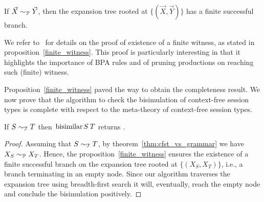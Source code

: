 \begin{proposition} 
\label{finite_witness}
	If $\vec X \sim_\mathcal P \vec Y$, then the expansion tree rooted at
	$\{(\vec X, \vec Y)\}$ has a finite successful branch.
\end{proposition}

We refer to~\cite{DBLP:journals/iandc/ChristensenHS95, caucal1986decidabilite}
for details on the proof of existence of a finite witness, as stated in 
proposition~\ref{finite_witness}. This proof is particularly interesting in that 
it highlights the importance of BPA rules and of pruning productions
on reaching such (finite) witness.

Proposition~\ref{finite_witness} paved the way to obtain the completeness result. 
We now prove that the algorithm to check the bisimulation of context-free session 
types is complete with respect to the meta-theory of context-free session
types.

\begin{theorem}
  If $S \sim_\mathcal T T$ then $\bisimf S T$ returns
  .
\end{theorem}

\begin{proof}
  Assuming that $S \sim_\mathcal T T$, by theorem~\ref{thm:cfst_vs_grammar}
  we have $X_{S} \sim_\mathcal P X_{T}$.  Hence, the proposition~\ref{finite_witness}
  ensures the existence of a finite successful branch on the
  expansion tree rooted at $\{(X_{S},X_{T})\}$, i.e., a branch
  terminating in an empty node.  Since our algorithm traverses the
  expansion tree using breadth-first search it will, eventually, reach
  the empty node and conclude the bisimulation positively.
\end{proof}

